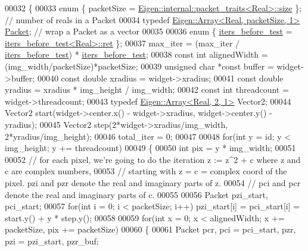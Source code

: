 \begin{DoxyCode}
00032 \{
00033   \textcolor{keyword}{enum} \{ packetSize = \hyperlink{struct_eigen_1_1internal_1_1packet__traits}{Eigen::internal::packet\_traits<Real>::size} 
      \}; \textcolor{comment}{// number of reals in a Packet}
00034   \textcolor{keyword}{typedef} \hyperlink{group___core___module_class_eigen_1_1_array}{Eigen::Array<Real, packetSize, 1>} 
      \hyperlink{group___sparse_core___module}{Packet}; \textcolor{comment}{// wrap a Packet as a vector}
00035 
00036   \textcolor{keyword}{enum} \{ \hyperlink{structiters__before__test}{iters\_before\_test} = \hyperlink{structiters__before__test}{iters\_before\_test<Real>::ret} \};
00037   max\_iter = (max\_iter / \hyperlink{structiters__before__test}{iters\_before\_test}) * \hyperlink{structiters__before__test}{iters\_before\_test};
00038   \textcolor{keyword}{const} \textcolor{keywordtype}{int} alignedWidth = (img\_width/packetSize)*packetSize;
00039   \textcolor{keywordtype}{unsigned} \textcolor{keywordtype}{char} *\textcolor{keyword}{const} buffer = widget->buffer;
00040   \textcolor{keyword}{const} \textcolor{keywordtype}{double} xradius = widget->xradius;
00041   \textcolor{keyword}{const} \textcolor{keywordtype}{double} yradius = xradius * img\_height / img\_width;
00042   \textcolor{keyword}{const} \textcolor{keywordtype}{int} threadcount = widget->threadcount;
00043   \textcolor{keyword}{typedef} \hyperlink{group___core___module_class_eigen_1_1_array}{Eigen::Array<Real, 2, 1>} Vector2;
00044   Vector2 start(widget->center.x() - widget->xradius, widget->center.y() - yradius);
00045   Vector2 step(2*widget->xradius/img\_width, 2*yradius/img\_height);
00046   total\_iter = 0;
00047 
00048   \textcolor{keywordflow}{for}(\textcolor{keywordtype}{int} y = \textcolor{keywordtype}{id}; y < img\_height; y += threadcount)
00049   \{
00050     \textcolor{keywordtype}{int} pix = y * img\_width;
00051 
00052     \textcolor{comment}{// for each pixel, we're going to do the iteration z := z^2 + c where z and c are complex numbers, }
00053     \textcolor{comment}{// starting with z = c = complex coord of the pixel. pzi and pzr denote the real and imaginary parts of
       z.}
00054     \textcolor{comment}{// pci and pcr denote the real and imaginary parts of c.}
00055 
00056     Packet pzi\_start, pci\_start;
00057     \textcolor{keywordflow}{for}(\textcolor{keywordtype}{int} i = 0; i < packetSize; i++) pzi\_start[i] = pci\_start[i] = start.y() + y * step.y();
00058 
00059     \textcolor{keywordflow}{for}(\textcolor{keywordtype}{int} x = 0; x < alignedWidth; x += packetSize, pix += packetSize)
00060     \{
00061       Packet pcr, pci = pci\_start, pzr, pzi = pzi\_start, pzr\_buf;

\end{DoxyCode}
